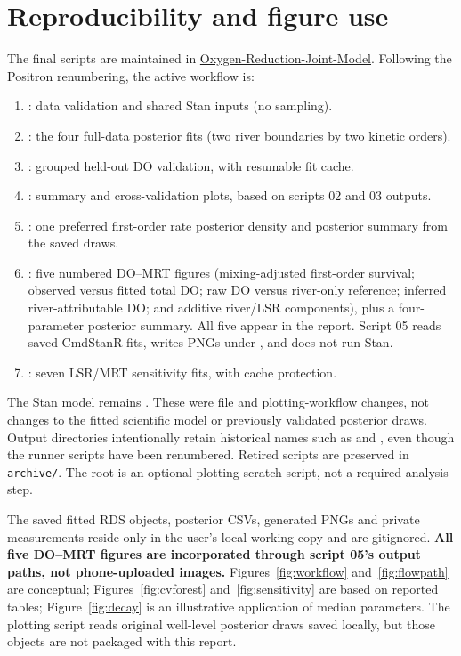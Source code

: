 \documentclass[11pt,a4paper]{article}
\newcommand{\repo}{\href{https://github.com/YugiBeer/Oxygen-Reduction-Joint-Model}{Oxygen-Reduction-Joint-Model}}
\begin{document}
\section{Reproducibility and figure use}
The final scripts are maintained in \repo. Following the Positron renumbering, the active workflow is:
\begin{enumerate}[leftmargin=14pt,itemsep=0pt]
\item {}: data validation and shared Stan inputs (no sampling).
\item {}: the four full-data posterior fits (two river boundaries by two kinetic orders).
\item {}: grouped held-out DO validation, with resumable fit cache.
\item {}: summary and cross-validation plots, based on scripts 02 and 03 outputs.
\item {}: one preferred first-order rate posterior density and posterior summary from the saved draws.
\item {}: five numbered DO--MRT figures (mixing-adjusted first-order survival; observed versus fitted total DO; raw DO versus river-only reference; inferred river-attributable DO; and additive river/LSR components), plus a four-parameter posterior summary. All five appear in the report. Script 05 reads saved CmdStanR fits, writes PNGs under , and does not run Stan.
\item {}: seven LSR/MRT sensitivity fits, with cache protection.
\end{enumerate}
The Stan model remains . These were file and plotting-workflow changes, not changes to the fitted scientific model or previously validated posterior draws. Output directories intentionally retain historical names such as  and , even though the runner scripts have been renumbered. Retired scripts are preserved in \texttt{archive/}. The root  is an optional plotting scratch script, not a required analysis step.

The saved fitted RDS objects, posterior CSVs, generated PNGs and private measurements reside only in the user's local working copy and are gitignored. \textbf{All five DO--MRT figures are incorporated through script 05's output paths, not phone-uploaded images.} Figures~\ref{fig:workflow} and~\ref{fig:flowpath} are conceptual; Figures~\ref{fig:cvforest} and~\ref{fig:sensitivity} are based on reported tables; Figure~\ref{fig:decay} is an illustrative application of median parameters. The plotting script reads original well-level posterior draws saved locally, but those objects are not packaged with this report.
\end{document}
